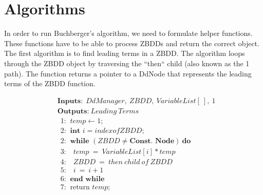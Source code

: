 \documentclass[letterpaper, 10 pt, conference]{ieeeconf}
\begin{document}
\section{Algorithms}
\label{sec:algorithms}
In order to run Buchberger's algorithm, we need to formulate helper functions.  These functions have to be able to process ZBDDs and return the correct object.  The first algorithm is to find leading terms in a ZBDD.  The algorithm loops through the ZBDD object by traversing the ``then`` child (also known as the 1  path).  The function returns a pointer to a DdNode that represents the leading terms of the ZBDD function.
{\small
\begin{align*}
&\textbf{Inputs:}\ \ DdManager,\ ZBDD,\ Variable List[\ ],\ 1 \\
&\textbf{Outputs:}\ Leading\ Terms \\
&\ \ \text{1: }\ temp\leftarrow 1; \\
&\ \ \text{2: }\ \textbf{int } i = index of ZBDD; \\
&\ \ \text{2: }\ \textbf{while }(ZBDD\neq \textbf{Const. Node})\ \textbf{do} \\
&\ \ \text{3: }\ \ \ temp\ =\ VariableList[i]*temp \\
&\ \ \text{4: }\ \ \ ZBDD\ =\ then\ child\ of\ ZBDD \\
&\ \ \text{5: }\ \ \ i\ =\ i + 1 \\
&\ \ \text{6: }\ \textbf{end while} \\
&\ \ \text{7: }\ \text{return } temp;
\end{align*}
\par}
\end{document}
